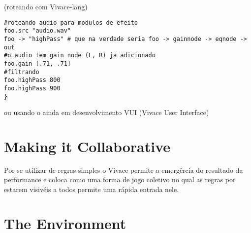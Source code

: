 \documentclass[letterpaper, 12pt]{article}
\begin{document}
(roteando com Vivace-lang)
\begin{Verbatim}[fontfamily=courier, xleftmargin=\parindent]
#roteando audio para modulos de efeito
foo.src "audio.wav"
foo -> "highPass" # que na verdade seria foo -> gainnode -> eqnode -> out
#o audio tem gain node (L, R) ja adicionado
foo.gain [.71, .71]
#filtrando 
foo.highPass 800
foo.highPass 900
}
\end{Verbatim}
ou usando o ainda em desenvolvimento VUI (Vivace User Interface)
\section{Making it Collaborative}
%
%
%
Por se utilizar de regras simples o Vivace permite a emergêrcia do resultado da performance e coloca como uma forma de jogo coletivo no qual as regras por estarem visivéis a todos permite uma rápida entrada nele. 
\section{The Environment}
\end{document}
